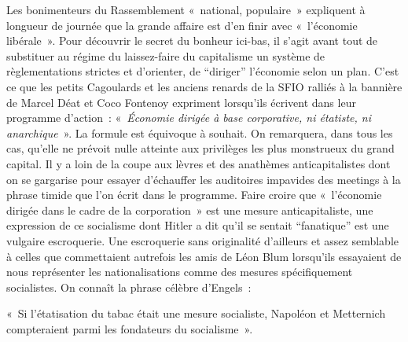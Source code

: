 \documentclass[french,twoside]{book} %
\newenvironment{quoteblock}%
  {\begin{quoting}}
  {\end{quoting}}
\newcommand\chaptercont{} %
\newenvironment{quotebar}{%
    \def\FrameCommand{{\color{rubric!10!}\vrule width 0.5em} \hspace{0.9em}}%
    \def\OuterFrameSep{\itemsep} %
    \MakeFramed {\advance\hsize-\width \FrameRestore}
  }%
  {%
    \endMakeFramed
  }
\renewenvironment{quoteblock}%
  {%
    \savenotes
    \setstretch{0.9}
    \normalfont
    \begin{quotebar}
  }
  {%
    \end{quotebar}
    \spewnotes
  }
\begin{document}
\chaptercont
\noindent Les bonimenteurs du Rassemblement « national, populaire » expliquent à longueur de journée que la grande affaire est d’en finir avec « l’économie libérale ». Pour découvrir le secret du bonheur ici-bas, il s’agit avant tout de substituer au régime du laissez-faire du capitalisme un système de règlementations strictes et d’orienter, de “diriger” l’économie selon un plan. C’est ce que les petits Cagoulards et les anciens renards de la SFIO ralliés à la bannière de Marcel Déat et Coco Fontenoy expriment lorsqu’ils écrivent dans leur programme d’action : « \emph{Économie dirigée à base corporative, ni étatiste, ni anarchique} ». La formule est équivoque à souhait. On remarquera, dans tous les cas, qu’elle ne prévoit nulle atteinte aux privilèges les plus monstrueux du grand capital. Il y a loin de la coupe aux lèvres et des anathèmes anticapitalistes dont on se gargarise pour essayer d’échauffer les auditoires impavides des meetings à la phrase timide que l’on écrit dans le programme. Faire croire que « l’économie dirigée dans le cadre de la corporation » est une mesure anticapitaliste, une expression de ce socialisme dont Hitler a dit qu’il se sentait “fanatique” est une vulgaire escroquerie. Une escroquerie sans originalité d’ailleurs et assez semblable à celles que commettaient autrefois les amis de Léon Blum lorsqu’ils essayaient de nous représenter les nationalisations comme des mesures spécifiquement socialistes. On connaît la phrase célèbre d’Engels :\par

\begin{quoteblock}
 \noindent « Si l’étatisation du tabac était une mesure socialiste, Napoléon et Metternich compteraient parmi les fondateurs du socialisme ».
 \end{quoteblock}
\end{document}
